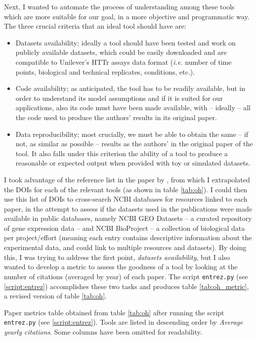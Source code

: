 \documentclass[10pt,a4paper]{article}
\begin{document}
Next, I wanted to automate the process of understanding among these tools which are more suitable for our goal, in a more objective and programmatic way. The three crucial criteria that an ideal tool should have are:
\begin{itemize}
    \item Datasets availability; ideally a tool should have been tested and work on publicly available datasets, which could be easily downloaded and are compatible to Unilever's HTTr assays data format (\textit{i.e.} number of time points, biological and technical replicates, conditions, etc.).
    \item Code availability; as anticipated, the tool has to be readily available, but in order to understand its model assumptions and if it is suited for our applications, also its code must have been made available, with -- ideally -- all the code used to produce the authors' results in its original paper.
    \item Data reproducibility; most crucially, we must be able to obtain the same -- if not, as similar as possible -- results as the authors' in the original paper of the tool. It also falls under this criterion the ability of a tool to produce a reasonable or expected output when provided with toy or simulated datasets.
\end{itemize}

I took advantage of the reference list in the paper by \citeauthor{ohTemporalDynamicMethods2021}, from which I extrapolated the DOIs for each of the relevant tools (as shown in table \ref{tab:oh}). I could then use this list of DOIs to cross-search NCBI databases for resources linked to each paper, in the attempt to assess if the datasets used  in the publications were made available in public databases, namely NCBI GEO Datasets -- a curated repository of gene expression data -- and NCBI BioProject -- a collection of biological data per project/effort (meaning each entry contains descriptive information about the experimental data, and could link to multiple resources and datasets). By doing this, I was trying to address the first point, \emph{datasets availability}, but I also wanted to develop a metric to assess the goodness of a tool by looking at the number of citations (averaged by year) of each paper. The script \texttt{entrez.py} (see \ref{script:entrez}) accomplishes these two tasks and produces table \ref{tab:oh_metric}, a revised version of table \ref{tab:oh}.

\begin{table}[!ht]
\centering\footnotesize

\caption{Paper metrics table obtained from table \ref{tab:oh} after running the script \texttt{entrez.py} (see \ref{script:entrez}). Tools are listed in descending order by \emph{Average yearly citations}. Some columns have been omitted for readability.}
\label{tab:oh_metric}
\end{table}
\end{document}
